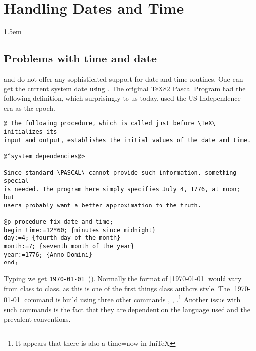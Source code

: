 
\makeatletter\@specialfalse\makeatother
{}
\chapter{Handling Dates and Time}
\label{dates}\label{ch:dates}

\parindent1.5em

\section{Problems with time and date}

\tex and \latex do not offer\cite{Thanh:TB18-4-249} any sophisticated support for date and time routines.
One can get the current system date using \cmd{\today}. The original TeX82 Pascal Program had the following definition, which surprisingly to us today, used the US Independence era as the epoch.

\begin{verbatim}
@ The following procedure, which is called just before \TeX\ initializes its
input and output, establishes the initial values of the date and time.

@^system dependencies@>

Since standard \PASCAL\ cannot provide such information, something special
is needed. The program here simply specifies July 4, 1776, at noon; but
users probably want a better approximation to the truth.

@p procedure fix_date_and_time;
begin time:=12*60; {minutes since midnight}
day:=4; {fourth day of the month}
month:=7; {seventh month of the year}
year:=1776; {Anno Domini}
end;
\end{verbatim}


Typing  we get \texttt{\today}\  (\ltxtoday). Normally the format of |\today| would vary from class to class, as this is one of the first things class authors style. The |\today| command is build using three other commands , , .\footnote{It appears that there is also a time=now in IniTeX} Another issue with such commands is the fact that they are dependent on the language used and the prevalent conventions. 

